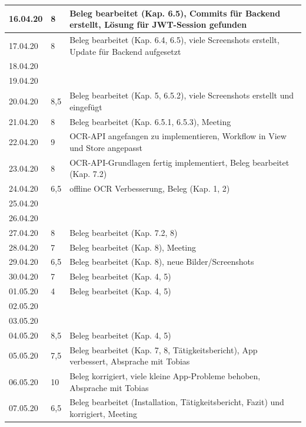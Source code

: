 \documentclass[notables, nomenclature, oneside, 150]{HSMW-Thesis}
\begin{document}
\begin{longtable}{
		|p{}
		|p{}
		|p{}|
	}
        16.04.20 & 8 & Beleg bearbeitet (Kap. 6.5), Commits für Backend erstellt, Lösung für JWT-Session gefunden \\ \hline
        17.04.20 & 8 & Beleg bearbeitet (Kap. 6.4, 6.5), viele Screenshots erstellt, Update für Backend aufgesetzt \\ \hline
        18.04.20 &  &  \\ \hline
        19.04.20 &  &  \\ \hline
        \hline
        20.04.20 & 8,5 & Beleg bearbeitet (Kap. 5, 6.5.2), viele Screenshots erstellt und eingefügt  \\ \hline
        21.04.20 & 8 & Beleg bearbeitet (Kap. 6.5.1, 6.5.3), Meeting \\ \hline
        22.04.20 & 9 & OCR-API angefangen zu implementieren, Workflow in View und Store angepasst \\ \hline
        23.04.20 & 8 & OCR-API-Grundlagen fertig implementiert, Beleg bearbeitet (Kap. 7.2) \\ \hline
        24.04.20 & 6,5 & offline OCR Verbesserung, Beleg (Kap. 1, 2) \\ \hline
        25.04.20 &  &  \\ \hline
        26.04.20 &  &  \\ \hline
        \hline
        27.04.20 & 8 & Beleg bearbeitet (Kap. 7.2, 8) \\ \hline
        28.04.20 & 7 & Beleg bearbeitet (Kap. 8), Meeting \\ \hline
        29.04.20 & 6,5 & Beleg bearbeitet (Kap. 8), neue Bilder/Screenshots \\ \hline
        30.04.20 & 7 & Beleg bearbeitet (Kap. 4, 5) \\ \hline
        01.05.20 & 4 & Beleg bearbeitet (Kap. 4, 5) \\ \hline
        02.05.20 &  &  \\ \hline
        03.05.20 &  &  \\ \hline
        \hline
        04.05.20 & 8,5 & Beleg bearbeitet (Kap. 4, 5) \\ \hline
        05.05.20 & 7,5 & Beleg bearbeitet (Kap. 7, 8, Tätigkeitsbericht), App verbessert, Absprache mit Tobias \\ \hline
        06.05.20 & 10 & Beleg korrigiert, viele kleine App-Probleme behoben, Absprache mit Tobias \\ \hline
        07.05.20 & 6,5 & Beleg bearbeitet (Installation, Tätigkeitsbericht, Fazit) und korrigiert, Meeting \\ \hline

\end{longtable}
\end{document}
